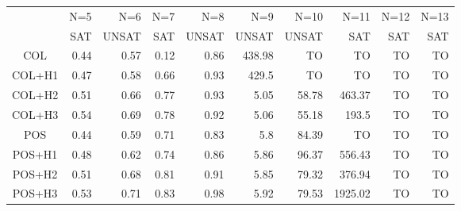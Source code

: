 \begin{tabular}[c]{c|r|r|r|r|r|r|r|r|r}\tiny
               & N=5  & N=6  & N=7  & N=8   &    N=9 &   N=10 &    N=11& N=12& N=13 \\
               & SAT  & UNSAT& SAT  & UNSAT &  UNSAT &  UNSAT &    SAT & SAT & SAT \\\hline
    COL        & \alert{0.44 }& \alert{0.57 }& \alert{0.12 }&  0.86 &  438.98&      TO&      TO&   TO& TO \\
    COL+H1     & 0.47 & 0.58 & 0.66 &  0.93 &   429.5&      TO&      TO&   TO& TO \\
    COL+H2     & 0.51 & 0.66 & 0.77 &  0.93 &    \alert{5.05}&   58.78&  463.37&   TO& TO \\
    COL+H3     & 0.54 & 0.69 & 0.78 &  0.92 &    5.06&   \alert{55.18}&   \alert{193.5}&   TO& TO \\
    POS        & \alert{0.44 }& 0.59 & 0.71 &  \alert{0.83 }&     5.8&   84.39&      TO&   TO& TO \\
    POS+H1     & 0.48 & 0.62 & 0.74 &  0.86 &    5.86&   96.37&  556.43&   TO& TO \\
    POS+H2     & 0.51 & 0.68 & 0.81 &  0.91 &    5.85&   79.32&  376.94&   TO& TO \\
    POS+H3     & 0.53 & 0.71 & 0.83 &  0.98 &    5.92&   79.53& 1925.02&   TO& TO 
\end{tabular}
